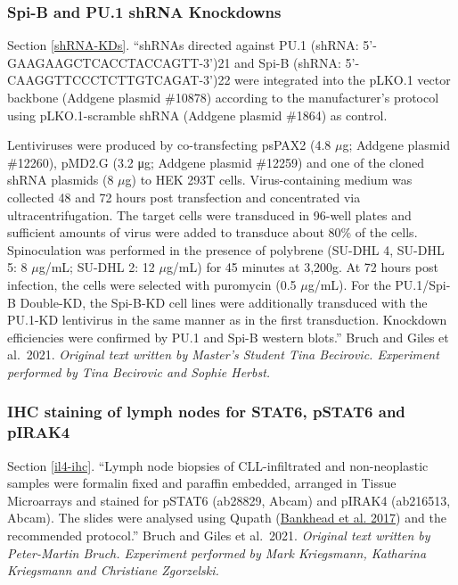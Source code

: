 \documentclass[11pt, a4paper, twosided]{book}
\begin{document}
\hypertarget{shRNA-KDs-method}{%
\subsubsection{Spi-B and PU.1 shRNA Knockdowns}\label{shRNA-KDs-method}}

Section \ref{shRNA-KDs}. ``shRNAs directed against PU.1 (shRNA: 5'-GAAGAAGCTCACCTACCAGTT-3')21 and Spi-B (shRNA: 5'-CAAGGTTCCCTCTTGTCAGAT-3')22 were integrated into the pLKO.1 vector backbone (Addgene plasmid \#10878) according to the manufacturer's protocol using pLKO.1-scramble shRNA (Addgene plasmid \#1864) as control.

Lentiviruses were produced by co-transfecting psPAX2 (4.8 \(\mu\)g; Addgene plasmid \#12260), pMD2.G (3.2 μg; Addgene plasmid \#12259) and one of the cloned shRNA plasmids (8 \(\mu\)g) to HEK 293T cells. Virus-containing medium was collected 48 and 72 hours post transfection and concentrated via ultracentrifugation. The target cells were transduced in 96-well plates and sufficient amounts of virus were added to transduce about 80\% of the cells. Spinoculation was performed in the presence of polybrene (SU-DHL 4, SU-DHL 5: 8 \(\mu\)g/mL; SU-DHL 2: 12 \(\mu\)g/mL) for 45 minutes at 3,200g. At 72 hours post infection, the cells were selected with puromycin (0.5 \(\mu\)g/mL). For the PU.1/Spi-B Double-KD, the Spi-B-KD cell lines were additionally transduced with the PU.1-KD lentivirus in the same manner as in the first transduction. Knockdown efficiencies were confirmed by PU.1 and Spi-B western blots.'' Bruch and Giles et al.~2021. \emph{Original text written by Master's Student Tina Becirovic. Experiment performed by Tina Becirovic and Sophie Herbst.}

\hypertarget{il4-ihc-exp}{%
\subsubsection{IHC staining of lymph nodes for STAT6, pSTAT6 and pIRAK4}\label{il4-ihc-exp}}

Section \ref{il4-ihc}. ``Lymph node biopsies of CLL-infiltrated and non-neoplastic samples were formalin fixed and paraffin embedded, arranged in Tissue Microarrays and stained for pSTAT6 (ab28829, Abcam) and pIRAK4 (ab216513, Abcam). The slides were analysed using Qupath (\protect\hyperlink{ref-Bankhead2017}{Bankhead et al. 2017}) and the recommended protocol.'' Bruch and Giles et al.~2021. \emph{Original text written by Peter-Martin Bruch. Experiment performed by Mark Kriegsmann, Katharina Kriegsmann and Christiane Zgorzelski.}
\end{document}
